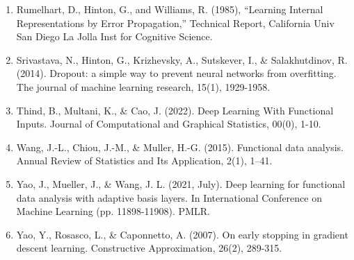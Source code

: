 \documentclass[
11pt, %
oneside, %
english, %
singlespacing, %
liststotoc, %
toctotoc, %
headsepline, %
]{MastersDoctoralThesis} %
\begin{document}
\begin{enumerate}
\item Rumelhart, D., Hinton, G., and Williams, R. (1985), “Learning Internal Representations by Error Propagation,” Technical Report, California Univ San Diego La Jolla Inst for Cognitive Science.
\item Srivastava, N., Hinton, G., Krizhevsky, A., Sutskever, I., \& Salakhutdinov, R. (2014). Dropout: a simple way to prevent neural networks from overfitting. The journal of machine learning research, 15(1), 1929-1958.
\item Thind, B., Multani, K., \& Cao, J. (2022). Deep Learning With Functional Inputs. Journal of Computational and Graphical Statistics, 00(0), 1-10. 
\item Wang, J.-L., Chiou, J.-M., \& Muller, H.-G. (2015). Functional data analysis. Annual Review of Statistics and Its Application, 2(1), 1–41. 
\item Yao, J., Mueller, J., \& Wang, J. L. (2021, July). Deep learning for functional data analysis with adaptive basis layers. In International Conference on Machine Learning (pp. 11898-11908). PMLR.
\item Yao, Y., Rosasco, L., \& Caponnetto, A. (2007). On early stopping in gradient descent learning. Constructive Approximation, 26(2), 289-315.
\end{enumerate}
\end{document}
